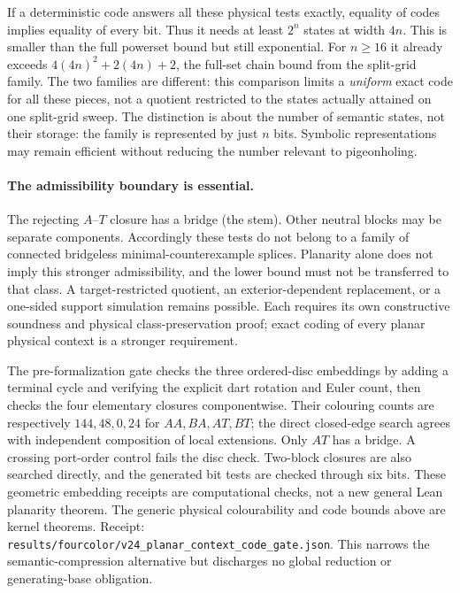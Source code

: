 If a deterministic code answers all these physical tests exactly, equality
of codes implies equality of every bit. Thus it needs at least $2^n$
states at width $4n$. This is smaller than the full powerset bound but
still exponential. For $n\ge16$ it already exceeds
$4(4n)^2+2(4n)+2$, the full-set chain bound from the split-grid family.
The two families are different: this comparison limits a \emph{uniform}
exact code for all these pieces, not a quotient restricted to the states
actually attained on one split-grid sweep.
The distinction is about the number of semantic states, not their storage:
the family is represented by just $n$ bits. Symbolic representations may
remain efficient without reducing the number relevant to pigeonholing.

\paragraph{The admissibility boundary is essential.}
The rejecting $A$--$T$ closure has a bridge (the stem). Other neutral
blocks may be separate components. Accordingly these tests do not belong
to a family of connected bridgeless minimal-counterexample splices.
Planarity alone does not imply this stronger admissibility, and the
lower bound must not be transferred to that class. A target-restricted
quotient, an exterior-dependent replacement, or a one-sided support
simulation remains possible. Each requires its own constructive
soundness and physical class-preservation proof; exact coding of every
planar physical context is a stronger requirement.

The pre-formalization gate checks the three ordered-disc embeddings by
adding a terminal cycle and verifying the explicit dart rotation and
Euler count, then checks the four elementary closures componentwise.
Their colouring counts are respectively $144,48,0,24$ for $AA,BA,AT,BT$;
the direct closed-edge search agrees with independent composition of
local extensions. Only $AT$ has a bridge. A crossing port-order control
fails the disc check. Two-block closures are also searched directly, and
the generated bit tests are checked through six bits. These geometric
embedding receipts are computational checks, not a new general Lean
planarity theorem. The generic physical colourability and code bounds
above are kernel theorems. Receipt:
\texttt{results/fourcolor/v24\_planar\_context\_code\_gate.json}.
This narrows the semantic-compression alternative but discharges no
global reduction or generating-base obligation.

